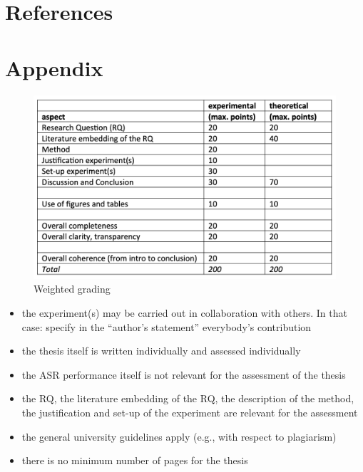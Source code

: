 \documentclass{article}
\theoremstyle{definition}
\theoremstyle{remark}
\begin{document}
\section{References}




\section{Appendix}

\begin{figure}[h]
    \centering
    \includegraphics[width=1\textwidth]{img/grading.png}
    \caption{Weighted grading}
    \label{fig:my_label}
\end{figure}

\begin{itemize}
	\item the experiment(s) may be carried out in collaboration with others. In that case: specify in the “author’s statement” everybody’s contribution
	\item the thesis itself is written individually and assessed individually
	\item the ASR performance itself is not relevant for the assessment of the thesis
	\item the RQ, the literature embedding of the RQ, the description of the method, the justification and set-up of the experiment are relevant for the assessment 
	\item the general university guidelines apply (e.g., with respect to plagiarism)
	\item there is no minimum number of pages for the thesis
\end{itemize}





\newpage




\end{document}
